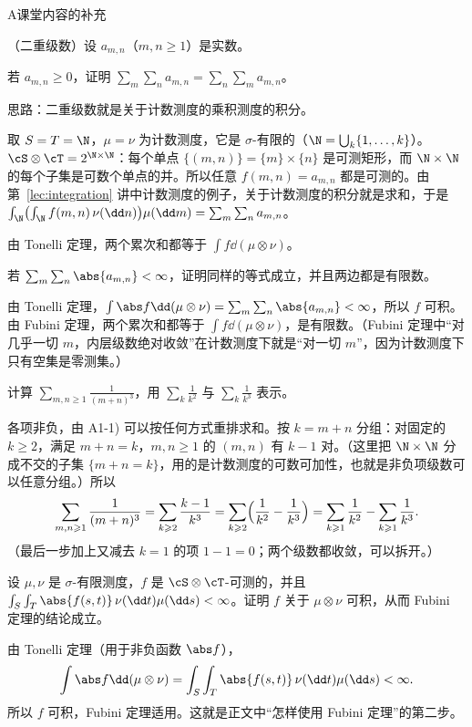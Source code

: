 
\begin{exercises}{A}{课堂内容的补充}
\item\label{ex:product:A1} （二重级数）设 $a_{m,n}$（$m,n\geqslant1$）是实数。
\begin{questions}
\item 若 $a_{m,n}\geqslant0$，证明 $\sum_m\sum_na_{m,n}=\sum_n\sum_ma_{m,n}$。
\begin{solution}
思路：二重级数就是关于计数测度的乘积测度的积分。

取 $S=T=\N$，$\mu=\nu$ 为计数测度，它是 $\sigma$-有限的（$\N=\bigcup_k\{1,\dots,k\}$）。$\cS\otimes\cT=2^{\N\times\N}$：每个单点 $\{(m,n)\}=\{m\}\times\{n\}$ 是可测矩形，而 $\N\times\N$ 的每个子集是可数个单点的并。所以任意 $f(m,n)=a_{m,n}$ 都是可测的。由第~\ref{lec:integration} 讲中计数测度的例子，关于计数测度的积分就是求和，于是 $\int_\N\bigl(\int_\N f(m,n)\,\nu(\dd n)\bigr)\mu(\dd m)=\sum_m\sum_na_{m,n}$。

由 Tonelli 定理，两个累次和都等于 $\int f\dd(\mu\otimes\nu)$。
\end{solution}
\item 若 $\sum_m\sum_n\abs{a_{m,n}}<\infty$，证明同样的等式成立，并且两边都是有限数。
\begin{solution}
由 Tonelli 定理，$\int\abs f\dd(\mu\otimes\nu)=\sum_m\sum_n\abs{a_{m,n}}<\infty$，所以 $f$ 可积。由 Fubini 定理，两个累次和都等于 $\int f\dd(\mu\otimes\nu)$，是有限数。（Fubini 定理中“对几乎一切 $m$，内层级数绝对收敛”在计数测度下就是“对一切 $m$”，因为计数测度下只有空集是零测集。）
\end{solution}
\item 计算 $\sum_{m,n\geqslant1}\frac1{(m+n)^3}$，用 $\sum_k\frac1{k^2}$ 与 $\sum_k\frac1{k^3}$ 表示。
\begin{solution}
各项非负，由 A1-1) 可以按任何方式重排求和。按 $k=m+n$ 分组：对固定的 $k\geqslant2$，满足 $m+n=k$，$m,n\geqslant1$ 的 $(m,n)$ 有 $k-1$ 对。（这里把 $\N\times\N$ 分成不交的子集 $\{m+n=k\}$，用的是计数测度的可数可加性，也就是非负项级数可以任意分组。）所以
\[
\sum_{m,n\geqslant1}\frac1{(m+n)^3}=\sum_{k\geqslant2}\frac{k-1}{k^3}=\sum_{k\geqslant2}\Bigl(\frac1{k^2}-\frac1{k^3}\Bigr)=\sum_{k\geqslant1}\frac1{k^2}-\sum_{k\geqslant1}\frac1{k^3}.
\]
（最后一步加上又减去 $k=1$ 的项 $1-1=0$；两个级数都收敛，可以拆开。）
\end{solution}
\end{questions}

\item\label{ex:product:A2} 设 $\mu,\nu$ 是 $\sigma$-有限测度，$f$ 是 $\cS\otimes\cT$-可测的，并且 $\int_S\int_T\abs{f(s,t)}\,\nu(\dd t)\mu(\dd s)<\infty$。证明 $f$ 关于 $\mu\otimes\nu$ 可积，从而 Fubini 定理的结论成立。
\begin{solution}
由 Tonelli 定理（用于非负函数 $\abs f$），
\[
\int\abs f\dd(\mu\otimes\nu)=\int_S\int_T\abs{f(s,t)}\,\nu(\dd t)\mu(\dd s)<\infty .
\]
所以 $f$ 可积，Fubini 定理适用。这就是正文中“怎样使用 Fubini 定理”的第二步。
\end{solution}


\end{exercises}
